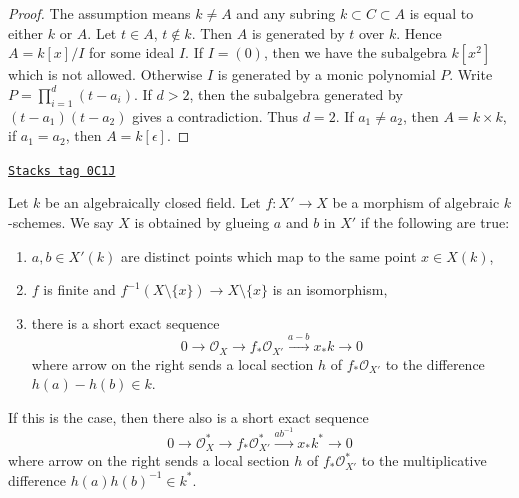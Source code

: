 \begin{proof}
The assumption means $k \not = A$ and any subring $k \subset C \subset A$
is equal to either $k$ or $A$. Let $t \in A$, $t \not \in k$.
Then $A$ is generated by $t$ over $k$. Hence $A = k[x]/I$ for some
ideal $I$. If $I = (0)$, then we have the subalgebra $k[x^2]$
which is not allowed. Otherwise $I$ is generated by a monic polynomial $P$.
Write $P = \prod_{i = 1}^d (t - a_i)$. If $d > 2$, then the subalgebra
generated by $(t - a_1)(t - a_2)$ gives a contradiction.
Thus $d = 2$. If $a_1 \not = a_2$, then $A = k \times k$,
if $a_1 = a_2$, then $A = k[\epsilon]$.
\end{proof}

\begin{example}

\label{curves-example-glue-points}
\href{https://stacks.math.columbia.edu/tag/0C1J}{\texttt{Stacks tag 0C1J}}

Let $k$ be an algebraically closed field. Let $f : X' \to X$
be a morphism of algebraic $k$-schemes. We say $X$ is
obtained by glueing $a$ and $b$ in $X'$ if the following are true:
\begin{enumerate}
\item $a, b \in X'(k)$ are distinct points which map to the same
point $x \in X(k)$,
\item $f$ is finite and
$f^{-1}(X \setminus \{x\}) \to X \setminus \{x\}$ is an isomorphism,
\item there is a short exact sequence
$$
0 \to \mathcal{O}_X \to f_*\mathcal{O}_{X'} \xrightarrow{a - b} x_*k \to 0
$$
where arrow on the right sends a local section $h$ of $f_*\mathcal{O}_{X'}$
to the difference $h(a) - h(b) \in k$.
\end{enumerate}
If this is the case, then there also is a short exact sequence
$$
0 \to \mathcal{O}_X^* \to f_*\mathcal{O}_{X'}^*
\xrightarrow{ab^{-1}} x_*k^* \to 0
$$
where arrow on the right sends a local section $h$ of $f_*\mathcal{O}_{X'}^*$
to the multiplicative difference $h(a)h(b)^{-1} \in k^*$.
\end{example}

